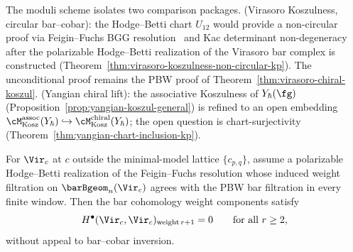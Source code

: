 \begin{remark}
\label{rem:fm-closures-kp}


The moduli scheme isolates two comparison packages.
\textup{} (Virasoro Koszulness, circular bar--cobar):
the Hodge--Betti chart $U_{12}$ would provide a non-circular proof
via Feigin--Fuchs BGG resolution~\cite{FeiginFuchs90,RCW82} and
Kac determinant non-degeneracy~\cite{KacBook} after the polarizable
Hodge--Betti realization of the Virasoro bar complex is constructed
(Theorem~\ref{thm:virasoro-koszulness-non-circular-kp}). The unconditional
proof remains the PBW proof of Theorem~\ref{thm:virasoro-chiral-koszul}.
\textup{} (Yangian chiral lift): the associative
Koszulness of $Y_\hbar(\fg)$
(Proposition~\ref{prop:yangian-koszul-general}) is refined to
an open embedding
$\cM_{\mathrm{Kosz}}^{\mathrm{assoc}}(Y_\hbar) \hookrightarrow
 \cM_{\mathrm{Kosz}}^{\mathrm{chiral}}(Y_\hbar)$;
the open question is chart-surjectivity
(Theorem~\ref{thm:yangian-chart-inclusion-kp}).
\end{remark}

\begin{theorem}
\label{thm:virasoro-koszulness-non-circular-kp}
For $\Vir_c$ at $c$ outside the minimal-model lattice
$\{c_{p,q}\}$, assume a polarizable Hodge--Betti realization of the
Feigin--Fuchs resolution whose induced weight filtration on
$\barBgeom_n(\Vir_c)$ agrees with the PBW bar filtration in every finite
window. Then the bar cohomology weight components satisfy
\[
H^\bullet(\Vir_c, \Vir_c)_{\mathrm{weight}\,r+1} = 0
\qquad \text{for all } r \geq 2,
\]
without appeal to bar--cobar inversion.
\end{theorem}

